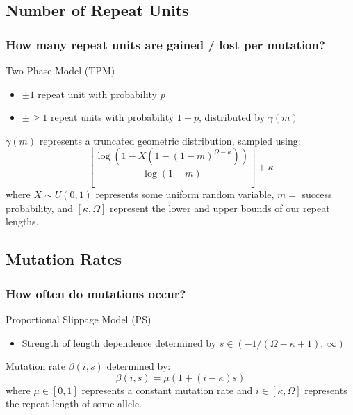 \documentclass[11pt]{beamer}
\begin{document}
	\subsection{Number of Repeat Units}\label{subsec:numberOfRepeatUnits}
	\begin{frame}
		\frametitle{How many repeat units are gained / lost per mutation?}
		\begin{block}{Two-Phase Model (TPM)}
			\begin{itemize}
				\item $\pm 1$ repeat unit with probability $p$
				\item $\pm \geq 1$ repeat units with probability $1 - p$, distributed by $\gamma(m)$
			\end{itemize}
		\end{block}\bigskip

		$\gamma(m)$ represents a truncated geometric distribution, sampled using:
		\begin{equation}
			\left\lfloor \frac{\log\left( 1 - X(1 - (1 - m)^{\Omega - \kappa})\right)}{\log(1 - m)}  \right\rfloor
			+ \kappa
		\end{equation}
		where $X\sim U(0, 1)$ represents some uniform random variable, $m = $ success probability,
		and $[\kappa, \Omega]$ represent the lower and upper bounds of our repeat lengths.
	\end{frame}

	\subsection{Mutation Rates}\label{subsec:mutationRates}
	\begin{frame}
		\frametitle{How often do mutations occur?}
		\begin{block}{Proportional Slippage Model (PS)}
			\begin{itemize}
				\item Strength of length dependence determined by $s \in (-1 / (\Omega - \kappa + 1), \ \infty)$
			\end{itemize}
		\end{block}\bigskip

		Mutation rate $\beta(i, s)$ determined by:
		\begin{equation}
			\beta(i, s) = \mu (1 + (i - \kappa)s)
		\end{equation}
		where $\mu \in [0, 1]$ represents a constant mutation rate and $i \in [\kappa, \Omega]$ represents the
		repeat length of some allele.
	\end{frame}
\end{document}
